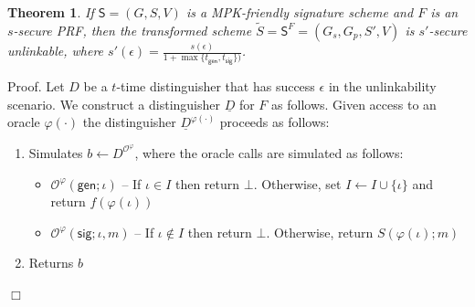 \documentclass{article}
\newtheorem{theorem}{Theorem}[section]
\newenvironment{proof}{\textsf{Proof}.}{\hfill$\Box$}
\begin{document}
\begin{theorem}
If $\mathsf{S}=(G,S,V)$ is a MPK-friendly signature scheme and $F$ is an $s$-secure PRF, then the transformed scheme $\tilde{S}=\mathsf{S}^F=(G_s,G_p,S',V)$ is $s'$-secure unlinkable, where $s'(\epsilon) = \frac{s(\epsilon)}{1+\max\{t_\mathsf{gen},t_\mathsf{sig}\})}$.
\end{theorem}

\begin{proof}
Let $D$ be a $t$-time distinguisher that has success $\epsilon$ in the unlinkability scenario. We construct a distinguisher $\underline{D}$ for $F$ as follows. Given access to an oracle $\varphi(\cdot)$ the distinguisher $\underline{D}^{\varphi(\cdot)}$
proceeds as follows:
\begin{enumerate}
\item Simulates $b\gets D^{\mathcal{O}^{\varphi}}$, where the oracle calls are simulated as follows:
\begin{itemize}
\item $\mathcal{O}^{\varphi}(\mathsf{gen};\iota)$ -- If $\iota\in I$ then return $\bot$. Otherwise, set $I\gets I \cup \{\iota\}$ and return $f(\varphi(\iota))$
\item $\mathcal{O}^{\varphi}(\mathsf{sig};\iota,m)$ -- If $\iota\not\in I$ then return $\bot$. Otherwise, return $S(\varphi(\iota);m)$
\end{itemize}
\item Returns $b$
\end{enumerate}


\end{proof}
\end{document}
